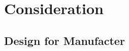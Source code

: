 
\chapter{Consideration} %



\ifpdf
    \graphicspath{{7/figures/PNG/}{7/figures/PDF/}{7/figures/}}
\else
    \graphicspath{{7/figures/EPS/}{7/figures/}}
\fi


\section{Design for Manufacter}



